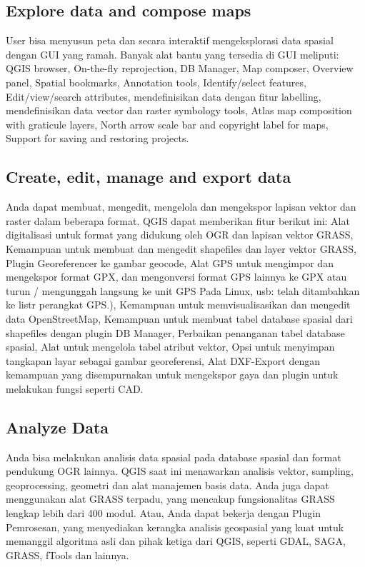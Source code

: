 	\subsection{Explore data and compose maps}
	User bisa menyusun peta dan secara interaktif mengeksplorasi data spasial dengan GUI yang ramah. Banyak alat bantu yang tersedia di GUI meliputi: QGIS browser, On-the-fly reprojection, DB Manager, Map composer, Overview panel, Spatial bookmarks, Annotation tools, Identify/select features, Edit/view/search attributes, mendefinisikan data dengan fitur labelling, mendefinisikan data  vector dan raster symbology tools, Atlas map composition with graticule layers, North arrow scale bar and copyright label for maps, Support for saving and restoring projects.
	\subsection{Create, edit, manage and export data}
	Anda dapat membuat, mengedit, mengelola dan mengekspor lapisan vektor dan raster dalam beberapa format. QGIS dapat memberikan fitur berikut ini: Alat digitalisasi untuk format yang didukung oleh OGR dan lapisan vektor GRASS, Kemampuan untuk membuat dan mengedit shapefiles dan layer vektor GRASS, Plugin Georeferencer ke gambar geocode, Alat GPS untuk mengimpor dan mengekspor format GPX, dan mengonversi format GPS lainnya ke GPX atau turun / mengunggah langsung ke unit GPS Pada Linux, usb: telah ditambahkan ke listr perangkat GPS.), Kemampuan untuk memvisualisasikan dan mengedit data OpenStreetMap, Kemampuan untuk membuat tabel database spasial dari shapefiles dengan plugin DB Manager, Perbaikan penanganan tabel database spasial, Alat untuk mengelola tabel atribut vektor, Opsi untuk menyimpan tangkapan layar sebagai gambar georeferensi, Alat DXF-Export dengan kemampuan yang disempurnakan untuk mengekspor gaya dan plugin untuk melakukan fungsi seperti CAD.
	\subsection{Analyze Data}
	Anda bisa melakukan analisis data spasial pada database spasial dan format pendukung OGR lainnya. QGIS saat ini menawarkan analisis vektor, sampling, geoprocessing, geometri dan alat manajemen basis data. Anda juga dapat menggunakan alat GRASS terpadu, yang mencakup fungsionalitas GRASS lengkap lebih dari 400 modul. Atau, Anda dapat bekerja dengan Plugin Pemrosesan, yang menyediakan kerangka analisis geospasial yang kuat untuk memanggil algoritma asli dan pihak ketiga dari QGIS, seperti GDAL, SAGA, GRASS, fTools dan lainnya.
